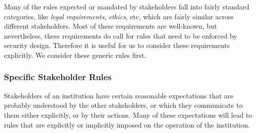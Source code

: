 Many of the rules expected or mandated by stakeholders fall into fairly standard categories, like
{\em legal requirements}, {\em ethics}, etc, which are fairly similar across different stakeholders.
Most of these requirements are well-known, but nevertheless, these requirements do call for 
rules that need to be enforced by security design. Therefore it is useful for us to consider these
requirements explicitly. We consider these generic rules first.

\subsubsection{Specific Stakeholder Rules}

Stakeholders of an institution have certain reasonable expectations that are
probably understood by the other stakeholders, or which they communicate to them
either explicitly, or by their actions. Many of these expectations will lead
to rules that are explicitly or implicitly imposed on the operation of the institution.

